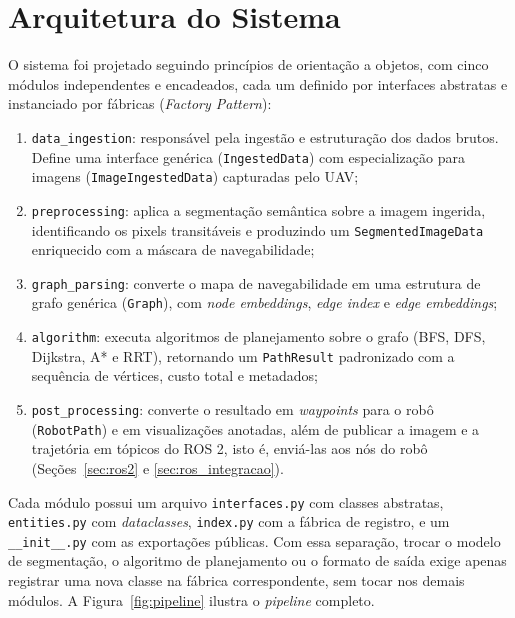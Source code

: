 \documentclass[
    12pt,
    openright,
    oneside,
    a4paper,
    english,
    brazil
]{abntex2}
\begin{document}
\section{Arquitetura do Sistema}

O sistema foi projetado seguindo princípios de orientação a objetos, com cinco módulos independentes e encadeados, cada um definido por interfaces abstratas e instanciado por fábricas (\textit{Factory Pattern}):

\begin{enumerate}
    \item \texttt{data\_\allowbreak{}ingestion}: responsável pela ingestão e estruturação dos dados brutos. Define uma interface genérica (\texttt{IngestedData}) com especialização para imagens (\texttt{Image\allowbreak Ingested\allowbreak Data}) capturadas pelo UAV;
    \item \texttt{preprocessing}: aplica a segmentação semântica sobre a imagem ingerida, identificando os pixels transitáveis e produzindo um \texttt{SegmentedImageData} enriquecido com a máscara de navegabilidade;
    \item \texttt{graph\_\allowbreak{}parsing}: converte o mapa de navegabilidade em uma estrutura de grafo genérica (\texttt{Graph}), com \textit{node embeddings}, \textit{edge index} e \textit{edge embeddings};
    \item \texttt{algorithm}: executa algoritmos de planejamento sobre o grafo (BFS, DFS, Dijkstra, A* e RRT), retornando um \texttt{PathResult} padronizado com a sequência de vértices, custo total e metadados;
    \item \texttt{post\_\allowbreak{}processing}: converte o resultado em \textit{waypoints} para o robô (\texttt{RobotPath}) e em visualizações anotadas, além de publicar a imagem e a trajetória em tópicos do ROS 2, isto é, enviá-las aos nós do robô (Seções~\ref{sec:ros2} e \ref{sec:ros_integracao}).
\end{enumerate}

Cada módulo possui um arquivo \texttt{interfaces.py} com classes abstratas, \texttt{entities.py} com \textit{dataclasses}, \texttt{index.py} com a fábrica de registro, e um \texttt{\_\allowbreak{}\_\allowbreak{}init\_\allowbreak{}\_\allowbreak{}.py} com as exportações públicas. Com essa separação, trocar o modelo de segmentação, o algoritmo de planejamento ou o formato de saída exige apenas registrar uma nova classe na fábrica correspondente, sem tocar nos demais módulos. A Figura~\ref{fig:pipeline} ilustra o \textit{pipeline} completo.
\end{document}
